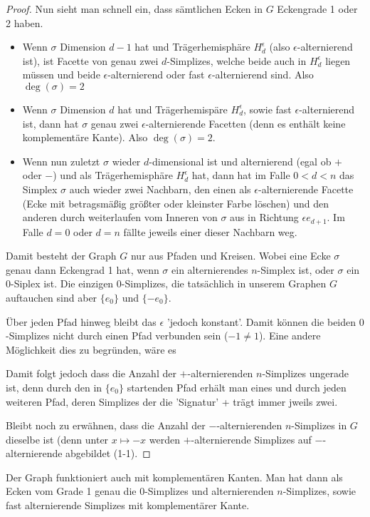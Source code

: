 \message{ !name(OnBorsukUlamsThoerem.tex)}\documentclass[10pt,a4paper]{article}
\begin{document}
\begin{proof}
Nun sieht man schnell ein, dass sämtlichen Ecken in $G$ Eckengrade 1 oder 2 haben.
\begin{itemize}
\item Wenn $\sigma$ Dimension $d-1$ hat und Trägerhemisphäre $H^\epsilon_d$ (also $\epsilon$-alternierend ist), ist Facette von genau zwei $d$-Simplizes, welche beide auch in $H^\epsilon_d$ liegen müssen und beide $\epsilon$-alternierend oder fast $\epsilon$-alternierend sind. Also $\deg(\sigma)=2$
\item Wenn $\sigma$ Dimension $d$ hat und Trägerhemispäre $H^\epsilon_d$, sowie fast $\epsilon$-alternierend ist, dann hat $\sigma$ genau zwei $\epsilon$-alternierende Facetten (denn es enthält keine komplementäre Kante). Also $\deg(\sigma)=2$.
\item Wenn nun zuletzt $\sigma$ wieder $d$-dimensional ist und alternierend (egal ob $+$ oder $-$) und als Trägerhemisphäre $H^\epsilon_d$ hat, dann hat im Falle $0<d<n$ das Simplex $\sigma$ auch wieder zwei Nachbarn, den einen als $\epsilon$-alternierende Facette (Ecke mit betragsmäßig größter oder kleinster Farbe löschen) und den anderen durch weiterlaufen vom Inneren von $\sigma$ aus in Richtung $\epsilon e_{d+1}$.
Im Falle $d=0$ oder $d=n$ fällte jeweils einer dieser Nachbarn weg.
\end{itemize}

Damit besteht der Graph $G$ nur aus Pfaden und Kreisen. Wobei eine Ecke $\sigma$ genau dann Eckengrad 1 hat, wenn $\sigma$ ein alternierendes $n$-Simplex ist, oder $\sigma$ ein $0$-Siplex ist. Die einzigen $0$-Simplizes, die tatsächlich in unserem Graphen $G$ auftauchen sind aber $\{e_0\}$ und $\{-e_0\}$.

Über jeden Pfad hinweg bleibt das $\epsilon$ 'jedoch konstant'. Damit können die beiden $0$-Simplizes nicht durch einen Pfad verbunden sein ($-1\neq 1$).
Eine andere Möglichkeit dies zu begründen, wäre es

Damit folgt jedoch dass die Anzahl der $+$-alternierenden $n$-Simplizes ungerade ist, denn durch den in $\{e_0\}$ startenden Pfad erhält man eines und durch jeden weiteren Pfad, deren Simplizes der die 'Signatur' + trägt immer jweils zwei.

Bleibt noch zu erwähnen, dass die Anzahl der $-$-alternierenden $n$-Simplizes in $G$ dieselbe ist (denn unter $x\mapsto-x$ werden $+$-alternierende Simplizes auf $-$-alternierende abgebildet (1-1).
\end{proof}

\begin{remark}
Der Graph funktioniert auch mit komplementären Kanten. Man hat dann als Ecken vom Grade 1 genau die $0$-Simplizes und alternierenden $n$-Simplizes, sowie fast alternierende Simplizes mit komplementärer Kante.
\end{remark}
\end{document}

